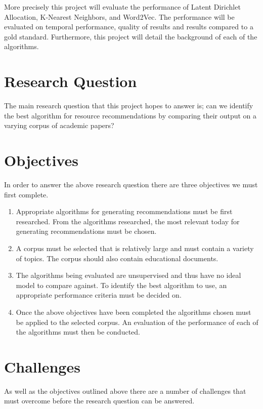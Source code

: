 More precisely this project will evaluate the performance of Latent Dirichlet Allocation, K-Nearest Neighbors, and Word2Vec.
The performance will be evaluated on temporal performance, quality of results and results compared to a gold standard.
Furthermore, this project will detail the background of each of the algorithms.

\section{Research Question}
The main research question that this project hopes to answer is; can we identify the best algorithm for resource recommendations by comparing their output on a varying corpus of academic papers?

\section{Objectives}
In order to answer the above research question there are three objectives we must first complete.

\begin{enumerate}
    \item Appropriate algorithms for generating recommendations must be first researched.
    From the algorithms researched, the most relevant today for generating recommendations must be chosen.

    \item A corpus must be selected that is relatively large and must contain a variety of topics.
    The corpus should also contain educational documents.

    \item The algorithms being evaluated are unsupervised and thus have no ideal model to compare against.
    To identify the best algorithm to use, an appropriate performance criteria must be decided on.

    \item Once the above objectives have been completed the algorithms chosen must be applied to the selected corpus.
    An evaluation of the performance of each of the algorithms must then be conducted.
\end{enumerate}

\section{Challenges}
As well as the objectives outlined above there are a number of challenges that must overcome before the research question can be answered.

